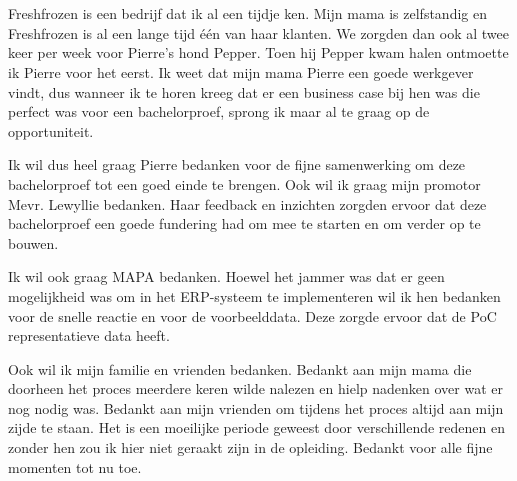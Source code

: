 
\chapter*{}%
\label{ch:voorwoord}


Freshfrozen is een bedrijf dat ik al een tijdje ken. Mijn mama is zelfstandig en Freshfrozen is al een lange tijd één van haar klanten. We zorgden dan ook al twee keer per week voor Pierre's hond Pepper. Toen hij Pepper kwam halen ontmoette ik Pierre voor het eerst. Ik weet dat mijn mama Pierre een goede werkgever vindt, dus wanneer ik te horen kreeg dat er een business case bij hen was die perfect was voor een bachelorproef, sprong ik maar al te graag op de opportuniteit.

Ik wil dus heel graag Pierre bedanken voor de fijne samenwerking om deze bachelorproef tot een goed einde te brengen. Ook wil ik graag mijn promotor Mevr. Lewyllie bedanken. Haar feedback en inzichten zorgden ervoor dat deze bachelorproef een goede fundering had om mee te starten en om verder op te bouwen.

Ik wil ook graag MAPA bedanken. Hoewel het jammer was dat er geen mogelijkheid was om in het ERP-systeem te implementeren wil ik hen bedanken voor de snelle reactie en voor de voorbeelddata. Deze zorgde ervoor dat de PoC representatieve data heeft.

Ook wil ik mijn familie en vrienden bedanken. Bedankt aan mijn mama die doorheen het proces meerdere keren wilde nalezen en hielp nadenken over wat er nog nodig was. Bedankt aan mijn vrienden om tijdens het proces altijd aan mijn zijde te staan. Het is een moeilijke periode geweest door verschillende redenen en zonder hen zou ik hier niet geraakt zijn in de opleiding. Bedankt voor alle fijne momenten tot nu toe.